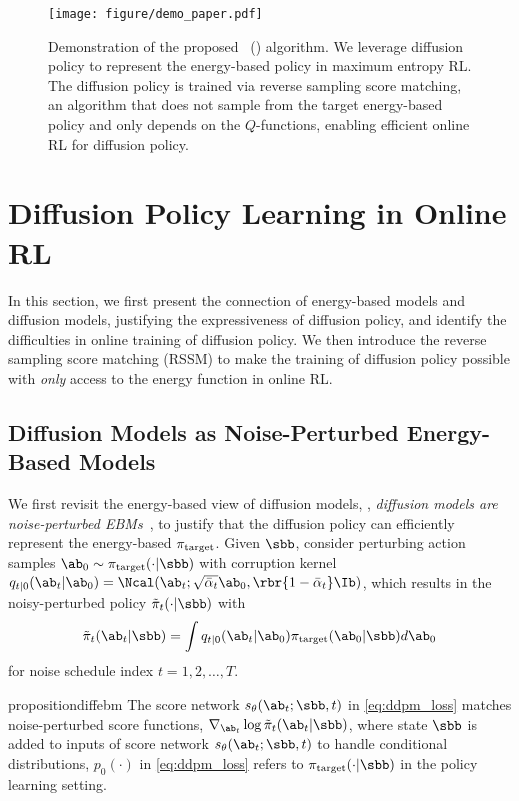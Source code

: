 \begin{figure*}[ht]
    \centering
    \texttt{[image: figure/demo\_paper.pdf]}
    \caption{Demonstration of the proposed \algname~(\algabb) algorithm. We leverage diffusion policy to represent the energy-based policy in maximum entropy RL. The diffusion policy is trained via reverse sampling score matching, an algorithm that does not sample from the target energy-based policy and only depends on the $Q$-functions, enabling efficient online RL for diffusion policy.}
    \label{fig:demo}
\end{figure*}
\section{Diffusion Policy Learning in Online RL}
\label{sec:rssm}

In this section, 
we first present the connection of energy-based models and diffusion models, justifying the expressiveness of diffusion policy, and identify the difficulties in online training of diffusion policy. 
We then introduce the reverse sampling score matching (RSSM) to make the training of diffusion policy possible with \emph{only} access to the energy function in online RL.  








\subsection{Diffusion Models as Noise-Perturbed Energy-Based Models} 
We first revisit the energy-based view of diffusion models, \ie, \emph{diffusion models are noise-perturbed EBMs}~\cite{shribak2024diffusion}, to justify that the diffusion policy can efficiently represent the energy-based $\pi_{\rm target}$. 
Given $\sbb$, consider perturbing action samples $\ab_0 \sim \pi_{\rm target}(\cdot|\sbb)$ with corruption kernel $q_{t|0}(\ab_t|\ab_0)=\Ncal(\ab_t;\sqrt{\bar\alpha_t}\ab_0, \rbr{1 - \bar\alpha_t}\Ib)$, 
which results in the noisy-perturbed policy $\tilde\pi_t(\cdot|\sbb)$ with 
$$
\tilde\pi_t(\ab_t|\sbb)= \int q_{t|0}(\ab_t|\ab_0)\pi_{\rm target}(\ab_0|\sbb)d\ab_0
$$
for noise schedule index $t=1,2,\dots, T$.


\begin{restatable}{proposition}{diffebm}
    The score network $s_\theta(\ab_t;\sbb, t)$ in \eqref{eq:ddpm_loss} matches noise-perturbed score functions, $\nabla_{\ab_t}\log \tilde\pi_t(\ab_t|\sbb)$,
        where state $\sbb$ is added to inputs of score network $s_\theta(\ab_t;\sbb, t)$ to handle conditional distributions, $p_0(\cdot)$ in \eqref{eq:ddpm_loss} refers to $\pi_{\rm target}(\cdot|\sbb)$ in the policy learning setting. \end{restatable}

